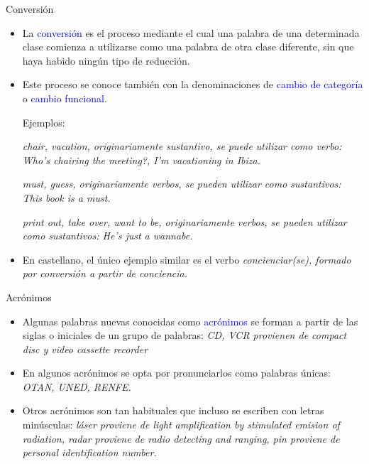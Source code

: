 \documentclass{beamer}
\begin{document}
\begin{frame}{Conversión}

\begin{itemize}
	\item La \textcolor{blue}{conversión} es el proceso mediante el cual una palabra de una determinada clase comienza a utilizarse como una palabra de otra clase diferente, sin que haya habido ningún tipo de reducción.
	
	\item Este proceso se conoce también con la denominaciones de \textcolor{blue}{cambio de categoría} o \textcolor{blue}{cambio funcional}.

	Ejemplos:
	
	\it{chair, vacation}, originariamente sustantivo, se puede utilizar como verbo:  \it{Who's chairing the meeting?}, \it{I'm vacationing in Ibiza}.
	
	\it{must, guess}, originariamente verbos, se pueden utilizar como sustantivos:  \it{This book is a must}.

	\it{print out, take over, want to be}, originariamente verbos, se pueden utilizar como sustantivos:  \it{He's just a wannabe}.
	\item En castellano, el único ejemplo similar es el verbo \it{concienciar(se)}, formado por conversión a partir de \it{conciencia}.
\end{itemize}
\end{frame}


\begin{frame}{Acrónimos}

\begin{itemize}
	\item Algunas palabras nuevas conocidas como \textcolor{blue}{acrónimos} se forman a partir de las siglas o iniciales de un grupo de palabras: \it{CD, VCR} provienen de \it{compact disc} y \it{video cassette recorder}

	\item En algunos acrónimos se opta por pronunciarlos como palabras únicas: \it{OTAN, UNED, RENFE}.
	
	\item Otros acrónimos son tan habituales que incluso se escriben con letras minúsculas: \it{láser} proviene de \it{light amplification by stimulated emision of radiation}, \it{radar} proviene de \it{radio detecting and ranging}, \it{pin} proviene de \it{personal identification number}.
\end{itemize}
\end{frame}
\end{document}
